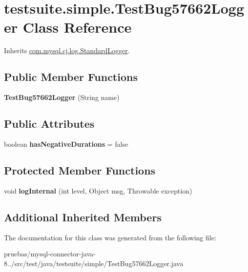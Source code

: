 \hypertarget{classtestsuite_1_1simple_1_1_test_bug57662_logger}{}\section{testsuite.\+simple.\+Test\+Bug57662\+Logger Class Reference}
\label{classtestsuite_1_1simple_1_1_test_bug57662_logger}


Inherits \mbox{\hyperlink{classcom_1_1mysql_1_1cj_1_1log_1_1_standard_logger}{com.\+mysql.\+cj.\+log.\+Standard\+Logger}}.

\subsection*{Public Member Functions}
\begin{DoxyCompactItemize}
\item 
\mbox{\label{classtestsuite_1_1simple_1_1_test_bug57662_logger_ad5de5a966ebc1284ca35c4cac0812573}} 
{\bfseries Test\+Bug57662\+Logger} (String name)
\end{DoxyCompactItemize}
\subsection*{Public Attributes}
\begin{DoxyCompactItemize}
\item 
\mbox{\label{classtestsuite_1_1simple_1_1_test_bug57662_logger_a1a1fd2583e436da2a249404307099ebd}} 
boolean {\bfseries has\+Negative\+Durations} = false
\end{DoxyCompactItemize}
\subsection*{Protected Member Functions}
\begin{DoxyCompactItemize}
\item 
\mbox{\label{classtestsuite_1_1simple_1_1_test_bug57662_logger_a7b8828ab839d0c5353bf8f4b784789ce}} 
void {\bfseries log\+Internal} (int level, Object msg, Throwable exception)
\end{DoxyCompactItemize}
\subsection*{Additional Inherited Members}


The documentation for this class was generated from the following file\+:\begin{DoxyCompactItemize}
\item 
pruebas/mysql-\/connector-\/java-\/8../src/test/java/testsuite/simple/Test\+Bug57662\+Logger.\+java\end{DoxyCompactItemize}
